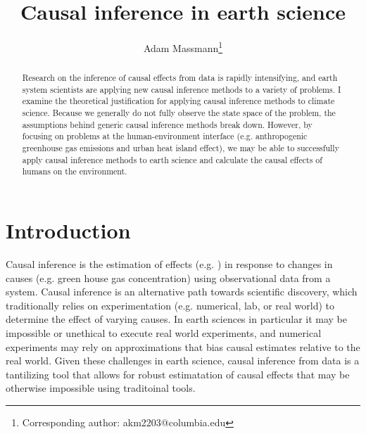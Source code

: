 \documentclass[12pt]{article}
\begin{document}
\title{Causal inference in earth science}

\author{Adam Massmann\thanks{Corresponding author: akm2203@columbia.edu}}

\maketitle

\begin{abstract}
  Research on the inference of causal effects from data is rapidly
  intensifying, and earth system scientists are applying new causal
  inference methods to a variety of problems. I examine the
  theoretical justification for applying causal inference methods to
  climate science. Because we generally do not fully observe the state
  space of the problem, the assumptions behind generic causal
  inference methods break down. However, by focusing on problems at
  the human-environment interface (e.g. anthropogenic greenhouse gas
  emissions and urban heat island effect), we may be able to
  successfully apply causal inference methods to earth science and
  calculate the causal effects of humans on the environment.

\end{abstract}

\section{Introduction}


Causal inference is the estimation of effects (e.g. ) in response to
changes in causes (e.g. green house gas concentration) using
observational data from a system. Causal inference is an alternative
path towards scientific discovery, which traditionally relies on
experimentation (e.g. numerical, lab, or real world) to determine the
effect of varying causes. In earth sciences in particular it may be
impossible or unethical to execute real world experiments, and
numerical experiments may rely on approximations that bias causal
estimates relative to the real world. Given these challenges in earth
science, causal inference from data is a tantilizing tool that allows
for robust estimatation of causal effects that may be otherwise
impossible using traditoinal tools.

\end{document}
